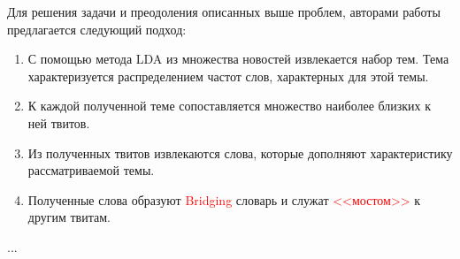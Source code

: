          Для решения задачи и преодоления описанных выше проблем, авторами работы предлагается следующий подход:
         \begin{enumerate}
            \item С помощью метода LDA из множества новостей извлекается набор тем. Тема характеризуется распределением частот слов, характерных для этой темы.
            \item К каждой полученной теме сопоставляется множество наиболее близких к ней твитов.
            \item Из полученных твитов извлекаются слова, которые дополняют характеристику рассматриваемой темы.
            \item Полученные слова образуют \textcolor{red}{Bridging} словарь и служат \textcolor{red}{<<мостом>>} к другим твитам.
         \end{enumerate}

         ...